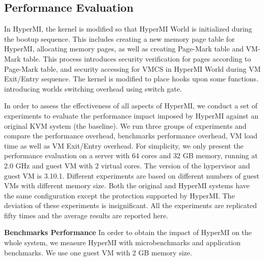 \documentclass[conference]{IEEEtran}
\begin{document}
\subsection{Performance Evaluation}

In HyperMI, the kernel is modified so that HyperMI World is initialized during the bootup sequence. This includes creating a new memory page table for HyperMI, allocating memory pages, as well as creating Page-Mark table and VM-Mark table. This process introduces security verification for pages according to Page-Mark table, and security accessing for VMCS in HyperMI World during VM Exit/Entry sequence.
The kernel is modified to place hooks upon some functions.
introducing worlds switching overhead using switch gate.

In order to assess the effectiveness of all aspects of HyperMI, we conduct a set of experiments to evaluate the performance impact imposed by HyperMI against an original KVM system (the baseline). We run three groups of experiments and compare the performance overhead, benchmarks performance overhead, VM load time as well as VM Exit/Entry overhead.
For simplicity, we only present the performance evaluation on a server with 64 cores and 32 GB memory, running at 2.0 GHz and guest VM with 2 virtual cores. The version of the hypervisor and guest VM is 3.10.1. Different experiments are based on different numbers of guest VMs with different memory size. Both the original and HyperMI systems have the same configuration except the protection supported by HyperMI. The deviation of these experiments is insignificant. All the experiments are replicated fifty times and the average results are reported here.



\textbf{Benchmarks Performance}
In order to obtain the impact of HyperMI on the whole system, we measure HyperMI with microbenchmarks and application benchmarks. 
We use one guest VM with 2 GB memory size. 
\end{document}
